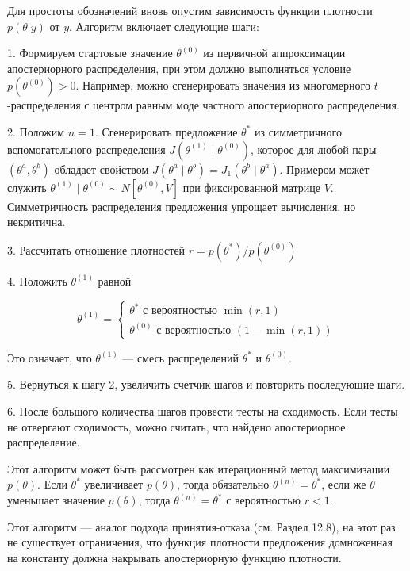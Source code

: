 Для простоты обозначений вновь опустим зависимость функции плотности $p(\theta|y)$ от $y$. Алгоритм включает следующие шаги:

1. Формируем стартовые значение $\theta^{(0)}$ из первичной аппроксимации апостериорного распределения, при этом должно выполняться условие $p(\theta^{(0)})>0$. Например, можно сгенерировать значения из многомерного $t$-распределения с центром равным моде частного апостериорного распределения.


2. Положим $n=1$. Сгенерировать предложение $\theta^*$ из симметричного вспомогательного распределения $J(\theta^{(1)}\mid \theta^{(0)})$, которое для любой пары $(\theta^a,\theta^b)$ обладает свойством $J(\theta^{a}\mid \theta^{b})=J_1(\theta^b\mid \theta^a)$. Примером может служить $\theta^{(1)}\mid \theta^{(0)} \sim N[\theta^{(0)},V]$ при фиксированной матрице $V$. Симметричность распределения предложения упрощает вычисления, но некритична.

3. Рассчитать отношение плотностей $r=p(\theta^*)/p(\theta^{(0)})$

4. Положить $\theta^{(1)}$ равной 

\[
\theta^{(1)}= \begin{cases}
\theta^* \text{ с вероятностью } \min(r,1) \\
\theta^{(0)} \text{ с вероятностью } (1-\min(r,1))
\end{cases}
\]


Это означает, что $\theta^{(1)}$ --- смесь распределений $\theta^*$ и  $\theta^{(0)}$.

5. Вернуться к шагу 2, увеличить счетчик шагов и повторить последующие шаги.

6. После большого количества шагов провести тесты на сходимость. Если тесты не отвергают сходимость, можно считать, что найдено апостериорное распределение.



Этот алгоритм может быть рассмотрен как итерационный метод максимизации $p(\theta)$. Если  $\theta^{*}$ увеличивает $p(\theta)$, тогда обязательно $\theta^{(n)}=\theta^{*}$, если же  $\theta$ уменьшает значение $p(\theta)$, тогда $\theta^{(n)}=\theta^*$ с вероятностью $r<1$. 

Этот алгоритм --- аналог подхода принятия-отказа (см. Раздел 12.8), на этот раз не существует ограничения, что функция плотности предложения домноженная на константу должна накрывать апостериорную функцию плотности.

